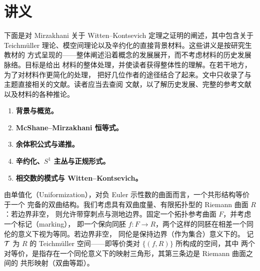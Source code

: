 
\section{讲义}

下面是对 Mirzakhani 关于 Witten--Kontsevich 定理之证明的阐述，其中包含关于
Teichm\"uller 理论、模空间理论以及辛约化的直接背景材料。这些讲义是按研究生教材的
方式呈现的——整体阐述沿着概念的发展展开，而不考虑材料的历史发展脉络。目标是给出
材料的整体处理，并使读者获得整体性的理解。在若干地方，为了对材料作更简化的处理，
把好几位作者的途径结合了起来。文中只收录了与主题直接相关的文献。读者应当去查阅
文献，以了解历史发展、完整的参考文献以及材料的各种推论。

\begin{enumerate}[leftmargin=1.8em,itemsep=2pt,topsep=2pt]
\item \textbf{背景与概览。}
\item \textbf{McShane--Mirzakhani 恒等式。}
\item \textbf{余体积公式与递推。}
\item \textbf{辛约化、$S^1$ 主丛与正规形式。}
\item \textbf{相交数的模式与 Witten--Kontsevich。}
\end{enumerate}



由单值化（Uniformization），对负 Euler 示性数的曲面而言，一个共形结构等价于一个
完备的双曲结构。我们考虑具有双曲度量、有限拓扑型的 Riemann 曲面 $R$：若边界非空，
则允许带穿刺点与测地边界。固定一个拓扑参考曲面 $F$，并考虑一个标记（marking），
即一个保向同胚 $f:F\to R$，两个这样的同胚在相差一个同伦的意义下视为等同。若边界非空，
同伦是保持边界（作为集合）意义下的。
记 $\mathcal{T}$ 为 $R$ 的 Teichm\"uller 空间——即等价类对 $\{(f,R)\}$ 所构成的空间，其中
两个对等价，是指存在一个同伦意义下的映射三角形，其第三条边是 Riemann 曲面之间的
共形映射（双曲等距）。


